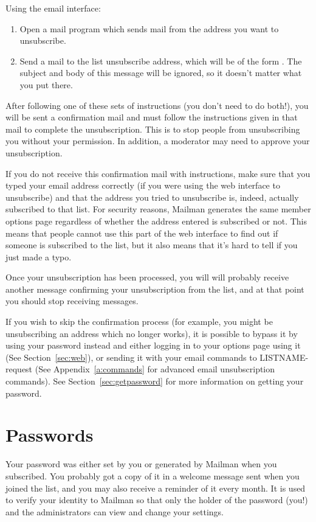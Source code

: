 \documentclass{howto}
\begin{document}
Using the email interface:
\begin{enumerate}
	\item Open a mail program which sends mail from the address you want to 
	unsubscribe.
	\item Send a mail to the list unsubscribe address, which will be of the form
	.  
	The subject and body
	of this message will be ignored, so it doesn't matter what you put there.
\end{enumerate}

After following one of these sets of instructions (you don't need to do
both!), you will be sent a confirmation mail and must follow the
instructions given in that mail to complete the unsubscription.  This is to
stop people from unsubscribing you without your permission.  In addition, a
moderator may need to approve your unsubscription.

If you do not receive this confirmation mail with instructions, make sure
that you typed your email address correctly (if you were using the web 
interface to unsubscribe) and that the address you tried
to unsubscribe is, indeed, actually subscribed to that list.  For security
reasons, Mailman generates the same member options page regardless of
whether the address entered is subscribed or not.  This means that people
cannot use this part of the web interface to find out if someone is
subscribed to the list, but it also means that it's hard to tell if you just
made a typo.

Once your unsubscription has been processed, you will will probably receive
another message confirming your unsubscription from the list, and at that
point you should stop receiving messages.

If you wish to skip the confirmation process (for example, you might be
unsubscribing an address which no longer works), it is possible to bypass it by
using your password instead and either logging in to your options page using
it (See Section~\ref{sec:web}), or sending it with your email commands to
LISTNAME-request (See Appendix~\ref{a:commands} for advanced email 
unsubscription commands). See Section~\ref{sec:getpassword} for more 
information on getting your password.

\section{Passwords\label{sec:password}}
Your password was either set by you or generated by Mailman when you
subscribed. 
You probably got a copy of it in a
welcome message sent when you joined the list, and you may also receive a
reminder of it every month.  It is used to verify your identity to Mailman
so that only the holder of the password (you!) and the administrators
can view and change your settings.  
\end{document}
